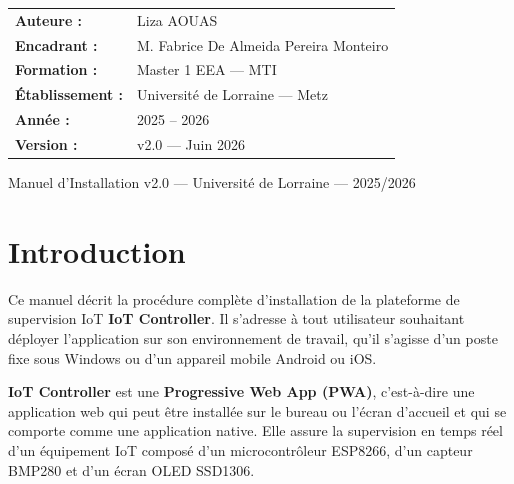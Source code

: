 \documentclass[a4paper,12pt]{article}
\begin{document}
\begin{titlepage}
\vspace{1.8cm}
\begin{center}
\begin{tcolorbox}[
  enhanced, colback=LightBlue!50, colframe=BorderGray,
  boxrule=0.8pt, arc=4pt, width=0.72\textwidth,
]
\renewcommand{\arraystretch}{1.5}
\begin{tabular}{@{}ll@{}}
  \textbf{\color{PrimaryBlue}Auteure :}        & Liza AOUAS \\
  \textbf{\color{PrimaryBlue}Encadrant :}      & M. Fabrice De Almeida Pereira Monteiro \\
  \textbf{\color{PrimaryBlue}Formation :}      & Master 1 EEA --- MTI \\
  \textbf{\color{PrimaryBlue}\'Etablissement :}& Universit\'e de Lorraine --- Metz \\
  \textbf{\color{PrimaryBlue}Ann\'ee :}        & 2025 -- 2026 \\
  \textbf{\color{PrimaryBlue}Version :}        & v2.0 --- Juin 2026 \\
\end{tabular}
\end{tcolorbox}
\end{center}

\vfill
\begin{center}
  {\color{white}\small Manuel d'Installation v2.0 --- Universit\'e de Lorraine --- 2025/2026}
\end{center}
\end{titlepage}
\restoregeometry

\thispagestyle{fancy}
\tableofcontents
\newpage

\section{Introduction}

Ce manuel d\'ecrit la proc\'edure compl\`ete d'installation de la plateforme de supervision IoT
\textbf{IoT Controller}. Il s'adresse \`a tout utilisateur souhaitant d\'eployer l'application
sur son environnement de travail, qu'il s'agisse d'un poste fixe sous Windows ou d'un
appareil mobile Android ou iOS.

\textbf{IoT Controller} est une \textbf{Progressive Web App (PWA)}, c'est-\`a-dire une
application web qui peut \^etre install\'ee sur le bureau ou l'\'ecran d'accueil et qui se comporte
comme une application native. Elle assure la supervision en temps r\'eel d'un \'equipement IoT
compos\'e d'un microcontr\^oleur ESP8266, d'un capteur BMP280 et d'un \'ecran OLED SSD1306.
\end{document}
